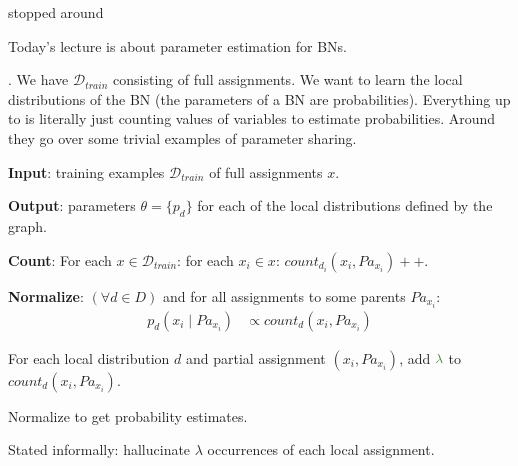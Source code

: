 \documentclass[11pt]{article}
\newcommand\myspace[1][]{\vspace{#1\bigskipamount}\Needspace{10\baselineskip}}
\newcommand\p{\Needspace{10\baselineskip} \noindent}
\newcommand\bluesec[1]{\myspace \p \blue{#1}}
\begin{document}
stopped around 






Today's lecture is about parameter estimation for BNs.

\bluesec{Supervised Learning}. We have $\mathcal D_{train}$ consisting of full assignments. We want to learn the local distributions of the BN (the parameters of a BN are probabilities). Everything up to  is literally just counting values of variables to estimate probabilities. Around  they go over some trivial examples of parameter sharing.

\begin{algorithm}
	\textbf{Input}: training examples $\mathcal D_{train}$ of full assignments $x$.
	
	\textbf{Output}: parameters $\theta = \{p_d\}$ for each of the local distributions defined by the graph.
	
	\begin{compactenum}
		\item 	\textbf{Count}: For each $x \in \mathcal D_{train}$: for each $x_i \in x$: $count_{d_i}(x_i, Pa_{x_i})++$. 
		
		\item \textbf{Normalize}: $(\forall d \in D)$ and for all assignments to some parents $Pa_{x_i}$: 
		\begin{align}
			p_d(x_i \mid Pa_{x_i}) &\propto count_d(x_i, Pa_{x_i})
		\end{align}
	\end{compactenum}

\end{algorithm}


\begin{algorithm}
	\begin{compactenum}
		\item For each local distribution $d$ and partial assignment $(x_i, Pa_{x_i})$, add $\mgreen{\lambda}$ to $count_d(x_i, Pa_{x_i})$. 
		
		\item Normalize to get probability estimates.
	\end{compactenum}

	Stated informally: hallucinate $\lambda$ occurrences of each local assignment.
	
\end{algorithm}
\end{document}
